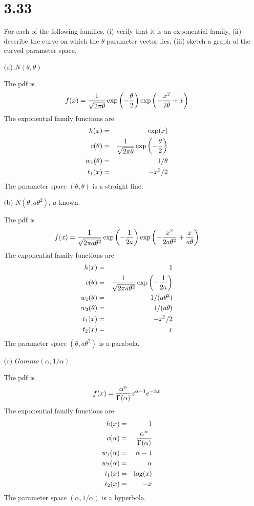 \section*{3.33}
For each of the following families, (i) verify that it is an
exponential family, (ii) describe the curve on which the $\theta$
parameter vector lies, (iii) sketch a graph of the curved parameter
space.

\bigskip
\noindent
(a) $N(\theta,\theta)$

\bigskip
\noindent
The pdf is
$$f(x)={1\over\sqrt{2\pi\theta}}
\exp\left(-{\theta\over2}\right)
\exp\left(-{x^2\over2\theta}+x\right)$$
The exponential family functions are
\begin{eqnarray*}
h(x)&=&\exp(x)\\
c(\theta)&=&{1\over\sqrt{2\pi\theta}}
\exp\left(-{\theta\over2}\right)\\
w_1(\theta)&=&1/\theta\\
t_1(x)&=&-x^2/2
\end{eqnarray*}
The parameter space $(\theta,\theta)$ is a straight
line.

\bigskip
\noindent
(b) $N(\theta,a\theta^2)$, $a$ known.

\bigskip
\noindent
The pdf is
$$f(x)={1\over\sqrt{2\pi a\theta^2}}
\exp\left(-{1\over2a}\right)
\exp\left(-{x^2\over2a\theta^2}+{x\over a\theta}\right)$$
The exponential family functions are
\begin{eqnarray*}
h(x)&=&1\\
c(\theta)&=&{1\over\sqrt{2\pi a\theta^2}}
\exp\left(-{1\over2a}\right)\\
w_1(\theta)&=&1/(a\theta^2)\\
w_2(\theta)&=&1/(a\theta)\\
t_1(x)&=&-x^2/2\\
t_2(x)&=&x
\end{eqnarray*}
The parameter space $(\theta,a\theta^2)$ is a
parabola.

\bigskip
\noindent
(c) $Gamma(\alpha,1/\alpha)$

\bigskip
\noindent
The pdf is
$$f(x)={\alpha^\alpha\over\Gamma(\alpha)}
x^{\alpha-1}e^{-\alpha x}$$
The exponential family functions are
\begin{eqnarray*}
h(x)&=&1\\
c(\alpha)&=&{\alpha^\alpha\over\Gamma(\alpha)}\\
w_1(\alpha)&=&\alpha-1\\
w_2(\alpha)&=&\alpha\\
t_1(x)&=&\log(x)\\
t_2(x)&=&-x
\end{eqnarray*}
The parameter space $(\alpha,1/\alpha)$ is
a hyperbola.

